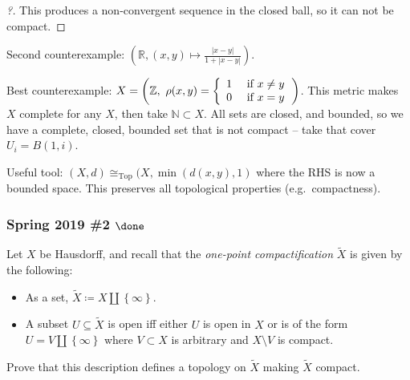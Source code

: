 \begin{solution}
\begin{proof}[?]
This produces a non-convergent sequence in the closed ball, so it can
not be compact.

\end{proof}

Second counterexample:
\(({\mathbb{R}}, (x,y) \mapsto \frac{{\left\lvert {x-y} \right\rvert}}{1 + {\left\lvert {x-y} \right\rvert}})\).

Best counterexample:
\(X = \left({\mathbb{Z}}, ~\rho ( x , y ) = \left\{ \begin{array} { l l } { 1 } & { \text { if } x \neq y } \\ { 0 } & { \text { if } x = y } \end{array} \right.\right)\).
This metric makes \(X\) complete for any \(X\), then take
\({\mathbb{N}}\subset X\). All sets are closed, and bounded, so we have
a complete, closed, bounded set that is not compact -- take that cover
\(U_i = B(1, i)\).

Useful tool: \((X, d) \cong_{\text{Top}} (X, \min{(d(x,y), 1)}\) where
the RHS is now a bounded space. This preserves all topological
properties (e.g.~compactness).

\end{solution}

\hypertarget{spring-2019-2-done}{%
\subsubsection{\texorpdfstring{Spring 2019 \#2
\(\done\)}{Spring 2019 \#2 \textbackslash done}}\label{spring-2019-2-done}}

Let \(X\) be Hausdorff, and recall that the \emph{one-point
compactification} \(\tilde X\) is given by the following:

\begin{itemize}
\item
  As a set, \(\tilde X \coloneqq X{\coprod}\left\{{\infty}\right\}\).
\item
  A subset \(U\subseteq \tilde X\) is open iff either \(U\) is open in
  \(X\) or is of the form \(U = V{\coprod}\left\{{\infty}\right\}\)
  where \(V\subset X\) is arbitrary and \(X\setminus V\) is compact.
\end{itemize}

Prove that this description defines a topology on \(\tilde X\) making
\(\tilde X\) compact.

